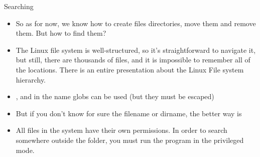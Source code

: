 \documentclass[usenames,dvipsnames,10pt,aspectratio=169]{beamer}
\begin{document}
\begin{frame}{Searching}
    \begin{itemize}
        \item So as for now, we know how to create files directories, move them and remove them. But how to find them?
        \item The Linux file system is well-structured, so it's straightforward to navigate it, but still, there are thousands of files, and it is impossible to remember all of the locations. There is an entire presentation about the Linux File system hierarchy.
        \item {}, and in the name globs can be used (but they must be escaped)
        \item But if you don't know for sure the filename or dirname, the better way is 
        \item {} All files in the system have their own permissions. In order to search somewhere outside the  folder, you must run the program in the privileged mode.
        
    \end{itemize}
\end{frame}
\end{document}

